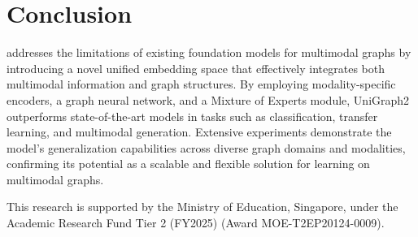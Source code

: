 \section{Conclusion}
\model addresses the limitations of existing foundation models for multimodal graphs by introducing a novel unified embedding space that effectively integrates both multimodal information and graph structures. By employing modality-specific encoders, a graph neural network, and a Mixture of Experts module, UniGraph2 outperforms state-of-the-art models in tasks such as classification, transfer learning, and multimodal generation. Extensive experiments demonstrate the model's generalization capabilities across diverse graph domains and modalities, confirming its potential as a scalable and flexible solution for learning on multimodal graphs.

\vspace{-3mm}

\begin{acks}
    This research is supported by the Ministry of Education, Singapore, under the Academic Research Fund Tier 2 (FY2025) (Award MOE-T2EP20124-0009).
\end{acks}